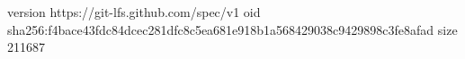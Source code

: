 version https://git-lfs.github.com/spec/v1
oid sha256:f4bace43fdc84dcec281dfc8c5ea681e918b1a568429038c9429898c3fe8afad
size 211687
